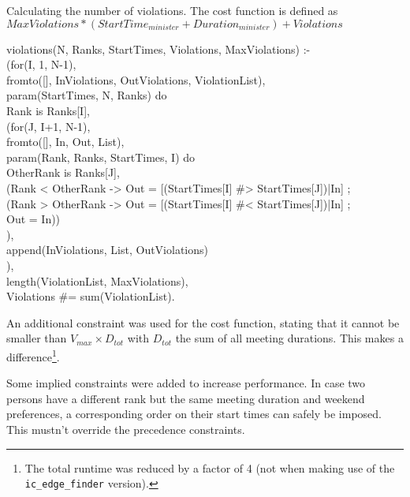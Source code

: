 \begin{snippet}[H]
\caption{Calculating the number of violations. The cost function is defined as $MaxViolations * (StartTime_{minister} + Duration_{minister}) + Violations$}\label{cost}
\small
violations(N, Ranks, StartTimes, Violations, MaxViolations) :-\\
    \qquad(for(I, 1, N-1),\\
     \qquad fromto([], InViolations, OutViolations, ViolationList),\\
     \qquad param(StartTimes, N, Ranks) do \\
        \qquad\qquad Rank is Ranks[I], \\
        \qquad\qquad (for(J, I+1, N-1), \\
         \qquad\qquad fromto([], In, Out, List), \\
         \qquad\qquad param(Rank, Ranks, StartTimes, I) do \\
            \qquad\qquad\qquad OtherRank is Ranks[J], \\
            \qquad\qquad\qquad (Rank < OtherRank -> Out = [(StartTimes[I] \#> StartTimes[J])|In] ; \\
            \qquad\qquad\qquad (Rank > OtherRank -> Out = [(StartTimes[I] \#< StartTimes[J])|In] ; \\
            \qquad\qquad\qquad Out = In)) \\
        \qquad\qquad ), \\
       \qquad\qquad append(InViolations, List, OutViolations) \\
    \qquad), \\
    \qquad length(ViolationList, MaxViolations), \\
    \qquad Violations \#= sum(ViolationList).
\end{snippet}

An additional constraint was used for the cost function, stating that it cannot be smaller than $V_{max}\times D_{tot}$ with $D_{tot}$ the sum of all meeting durations. This makes a difference\footnote{The total runtime was reduced by a factor of 4 (not when making use of the \texttt{ic\_edge\_finder} version).}.\\\par

Some implied constraints were added to increase performance. In case two persons have a different rank but the same meeting duration and weekend preferences, a corresponding order on their start times can safely be imposed. This mustn't override the precedence constraints.\\\par

